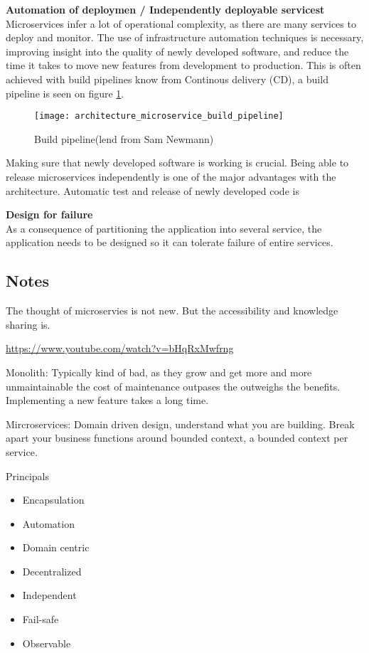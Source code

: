 \textbf{Automation of deploymen / Independently deployable servicest}\\
Microservices infer a lot of operational complexity, as there are many services to deploy and monitor. The use of infrastructure automation techniques is necessary, improving insight into the quality of newly developed software, and reduce the time it takes to move new features from development to production\cite{newman2015microservices}. This is often achieved with build pipelines know from Continous delivery (CD), a build pipeline is seen on figure \ref{fig:architecture_microservice_build_pipeline}.

\begin{figure}[!htb]
  \texttt{[image: architecture\_microservice\_build\_pipeline]}  
  \caption{Build pipeline(lend from Sam Newmann)}
  \label{fig:architecture_microservice_build_pipeline}
\end{figure}

Making sure that newly developed software is working is crucial. 
Being able to release microservices independently is one of the major advantages with the architecture. 
Automatic test and release of newly developed code is

\textbf{Design for failure}\\
As a consequence of partitioning the application into several service, the application needs to be designed so it can tolerate failure of entire services.


\subsection{Notes}
The thought of microservies is not new. But the accessibility and knowledge sharing is.

\url{https://www.youtube.com/watch?v=bHqRxMwfrng}

Monolith:
Typically kind of bad, as they grow and get more and more unmaintainable the cost of maintenance outpases the outweighs the benefits. Implementing a new feature takes a long time.

Mircroservices:
Domain driven design, understand what you are building. Break apart your business functions around bounded context, a bounded context per service.

Principals

\begin{itemize}
\item Encapsulation
\item Automation
\item Domain centric
\item Decentralized
\item Independent
\item Fail-safe
\item Observable
\end{itemize}

